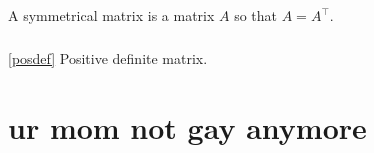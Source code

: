 \documentclass{report}
\begin{document}
\section{}

\subsection{}

A symmetrical matrix is a matrix $A$ so that $A=A^\top$.

\subsection{}

\ref{posdef} Positive definite matrix.

\chapter{}

\chapter{ur mom not gay anymore}
\end{document}
